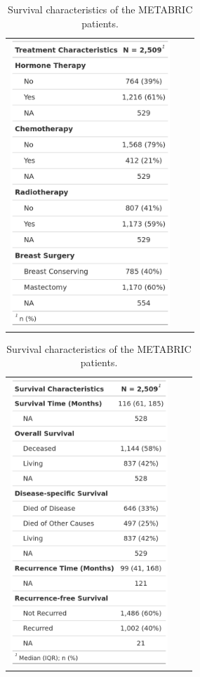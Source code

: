 \begin{table}[H]
\begin{minipage}[c]{0.48\textwidth}
\centering
\caption{Treatment characteristics of the METABRIC patients.}
\begin{tabular}{ccc}
\includegraphics[height = 10.8cm]{../tables/Introduction/Table2_Treatment.png}
\label{Treatment}
\end{tabular}
\end{minipage}
\hspace{0.4cm}
\begin{minipage}[c]{0.48\textwidth}
\centering
\caption{Survival characteristics of the METABRIC patients.}
\begin{tabular}{ccc}
\includegraphics[height = 10.8cm]{../tables/Introduction/Table3_Survival.png}
\label{SurvTable}
\end{tabular}
\end{minipage}
\end{table}
 

